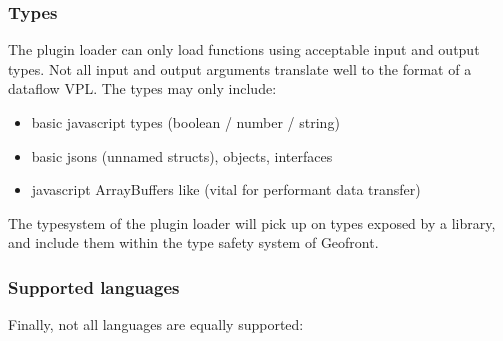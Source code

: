 \subsubsection*{Types}
The plugin loader can only load functions using acceptable input and output types. 
Not all input and output arguments translate well to the format of a dataflow VPL. 
The types may only include: 
\begin{itemize}
  \item basic javascript types (boolean / number / string)
  \item basic jsons (unnamed structs), objects, interfaces 
  \item javascript ArrayBuffers like  (vital for performant data transfer)
\end{itemize}
The typesystem of the plugin loader will pick up on types exposed by a library, and include them within the type safety system of Geofront. 

\subsubsection*{Supported languages}
Finally, not all languages are equally supported:

